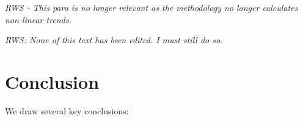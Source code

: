 \documentclass{ametsoc}
\begin{document}
\emph{RWS - This para is no longer relevant as the methodology no longer calculates non-linear trends.}



\emph{RWS: None of this text has been edited. I must still do so.}
\section{Conclusion}
We draw several key conclusions:
\end{document}
